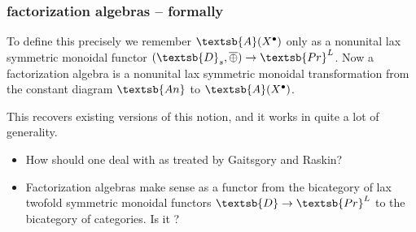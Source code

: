 \documentclass[11pt,xcolor={dvipsnames},hyperref={pdftex,pdfpagemode=UseNone,hidelinks,pdfdisplaydoctitle=true},usepdftitle=false]{beamer}
\renewcommand{\AA}{\textsb{A}}
\newcommand{\DD}{\textsb{D}}
\newcommand{\rightsum}{\mathbin{\overline{\oplus}}}
\begin{document}
\begin{frame}
  \frametitle{factorization algebras -- formally}
  To define this precisely we remember $\AA(X^{\bullet})$ only as a nonunital lax symmetric monoidal functor $(\DD_s,\rightsum) \to \textsb{Pr}^L$.
  Now a factorization algebra is a nonunital lax symmetric monoidal transformation from the constant diagram $\textsb{An}$ to $\AA(X^{\bullet})$.

  This recovers existing versions of this notion, and it works in quite a lot of generality.

  \bigskip

  \begin{itemize}
    \item How should one deal with  as treated by Gaitsgory and Raskin?
    \item Factorization algebras make sense as a functor from the bicategory of lax twofold symmetric monoidal functors $\DD \to \textsb{Pr}^L$ to the bicategory of categories. Is it ?
  \end{itemize}
\end{frame}
\end{document}
